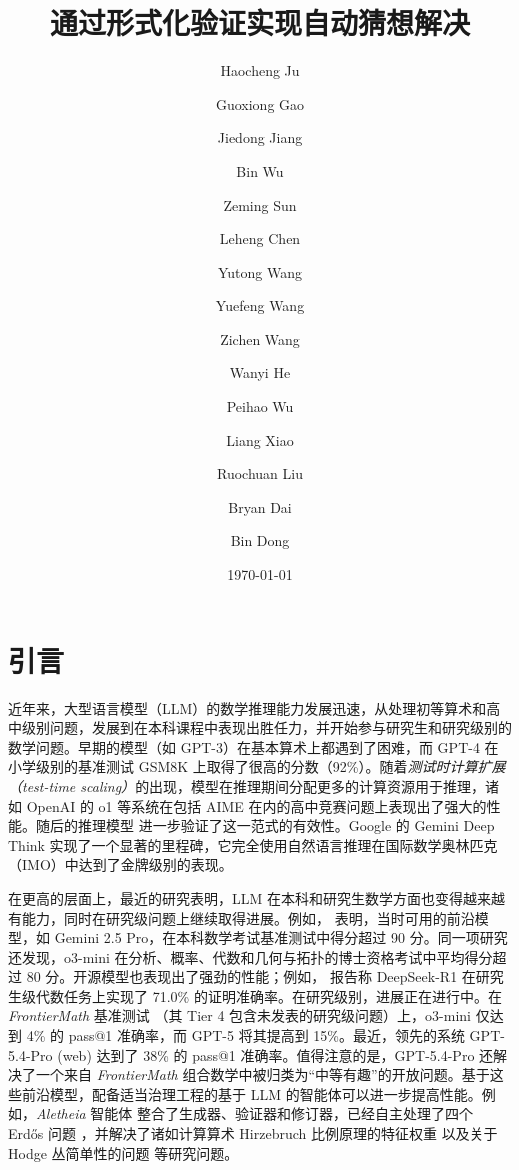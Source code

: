 ﻿\documentclass[]{pkuai4m}
\title{通过形式化验证实现自动猜想解决}
\author[1,5,\dagger,*]{Haocheng Ju}
\author[1,5,\ddagger,*]{Guoxiong Gao}
\author[2,*]{Jiedong Jiang}
\author[4,10,*]{Bin Wu}
\author[1,3,*]{Zeming Sun}
\author[1,5,10]{Leheng Chen}
\author[1,5]{Yutong Wang}
\author[1]{Yuefeng Wang}
\author[1,5]{Zichen Wang}
\author[1,5]{Wanyi He}
\author[5]{Peihao Wu}
\author[6]{Liang Xiao}
\author[6]{Ruochuan Liu}
\author[5,\P]{Bryan Dai}
\author[7,8,9,10\P]{Bin Dong}
\affiliation[]{
$^{1}$北京大学数学科学学院 \\
$^{2}$西湖大学理论科学研究院 \\
$^{3}$京都大学数理解析研究所 \\
$^{4}$天津大学数学学院 \\
$^{5}$IQuest Research \\
$^{6}$北京大学数学科学学院，新基石科学实验室 \\
$^{7}$北京大学北京国际数学研究中心及新基石科学实验室 \\
$^{8}$北京大学机器学习研究中心\\
$^{9}$大湾区大学（筹）智能计算中心 \\
$^{10}$中关村研究院 \\
}
\date{\today}
\theoremstyle{plain}
\theoremstyle{definition}
\begin{document}
\maketitle

\renewcommand{\thefootnote}{\fnsymbol{footnote}} 
\setcounter{footnote}{0}

% 

\renewcommand{\thefootnote}{\arabic{footnote}}
\pagestyle{fancy}
\fancyhf{}
\fancyhead[R]{\thepage}


\section{引言}

近年来，大型语言模型（LLM）的数学推理能力发展迅速，从处理初等算术和高中级别问题，发展到在本科课程中表现出胜任力，并开始参与研究生和研究级别的数学问题。早期的模型（如 GPT-3）在基本算术上都遇到了困难，而 GPT-4 \cite{achiam2023gpt} 在小学级别的基准测试 GSM8K 上取得了很高的分数（92\%）。随着\textit{测试时计算扩展（test-time scaling）}的出现，模型在推理期间分配更多的计算资源用于推理，诸如 OpenAI 的 o1 等系统在包括 AIME 在内的高中竞赛问题上表现出了强大的性能。随后的推理模型 \cite{guo2025deepseek,qwq32b,yang2025qwen3,comanici2025gemini} 进一步验证了这一范式的有效性。Google 的 Gemini Deep Think 实现了一个显著的里程碑，它完全使用自然语言推理在国际数学奥林匹克（IMO）中达到了金牌级别的表现。

在更高的层面上，最近的研究表明，LLM 在本科和研究生数学方面也变得越来越有能力，同时在研究级问题上继续取得进展。例如，\cite{ju2026ai} 表明，当时可用的前沿模型，如 Gemini 2.5 Pro，在本科数学考试基准测试中得分超过 90 分。同一项研究还发现，o3-mini 在分析、概率、代数和几何与拓扑的博士资格考试中平均得分超过 80 分。开源模型也表现出了强劲的性能；例如，\cite{jiang2025fate} 报告称 DeepSeek-R1 在研究生级代数任务上实现了 71.0\% 的证明准确率。在研究级别，进展正在进行中。在 \textit{FrontierMath} 基准测试 \cite{glazer2024frontiermath}（其 Tier 4 包含未发表的研究级问题）上，o3-mini 仅达到 4\% 的 pass@1 准确率，而 GPT-5 将其提高到 15\%。最近，领先的系统 GPT-5.4-Pro (web) 达到了 38\% 的 pass@1 准确率。值得注意的是，GPT-5.4-Pro 还解决了一个来自 \textit{FrontierMath} 组合数学中被归类为“中等有趣”的开放问题。基于这些前沿模型，配备适当治理工程的基于 LLM 的智能体可以进一步提高性能。例如，\textit{Aletheia} 智能体 \cite{feng2026towards} 整合了生成器、验证器和修订器，已经自主处理了四个 Erdős 问题 \cite{feng2026semi}，并解决了诸如计算算术 Hirzebruch 比例原理的特征权重 \cite{feng2026eigenweights} 以及关于 Hodge 丛简单性的问题 \cite{patel2026simplicity} 等研究问题。
\end{document}
